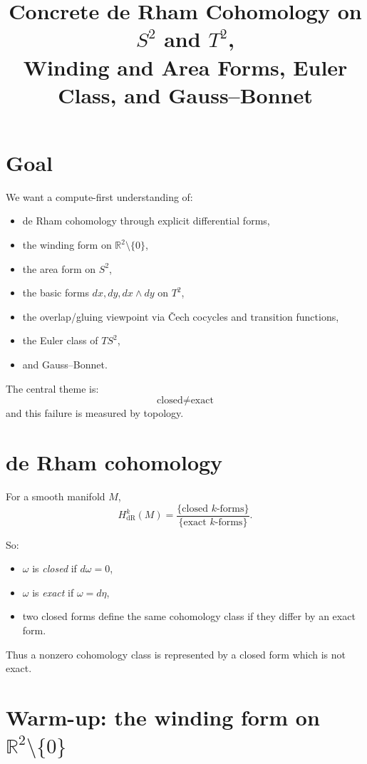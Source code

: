 \documentclass[11pt]{article}
\title{Concrete de Rham Cohomology on \(S^2\) and \(T^2\),\\
	Winding and Area Forms, Euler Class, and Gauss--Bonnet}
\author{}
\date{}
\begin{document}
	\maketitle
	
	\tableofcontents
	
	\section{Goal}
	
	We want a compute-first understanding of:
	\begin{itemize}[leftmargin=2em]
		\item de Rham cohomology through explicit differential forms,
		\item the winding form on \(\mathbb{R}^2\setminus\{0\}\),
		\item the area form on \(S^2\),
		\item the basic forms \(dx,dy,dx\wedge dy\) on \(T^2\),
		\item the overlap/gluing viewpoint via \v{C}ech cocycles and transition functions,
		\item the Euler class of \(TS^2\),
		\item and Gauss--Bonnet.
	\end{itemize}
	
	The central theme is:
	\[
	\boxed{\text{closed} \neq \text{exact}}
	\]
	and this failure is measured by topology.
	
	\section{de Rham cohomology}
	
	For a smooth manifold \(M\),
	\[
	H^k_{\mathrm{dR}}(M)
	=
	\frac{\{\text{closed }k\text{-forms}\}}{\{\text{exact }k\text{-forms}\}}.
	\]
	
	So:
	\begin{itemize}[leftmargin=2em]
		\item \(\omega\) is \emph{closed} if \(d\omega=0\),
		\item \(\omega\) is \emph{exact} if \(\omega=d\eta\),
		\item two closed forms define the same cohomology class if they differ by an exact form.
	\end{itemize}
	
	Thus a nonzero cohomology class is represented by a closed form which is not exact.
	
	\section{Warm-up: the winding form on \(\mathbb{R}^2\setminus\{0\}\)}
	
\end{document}
